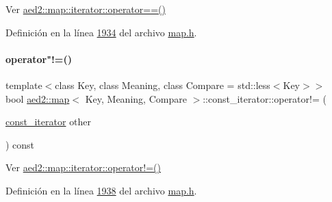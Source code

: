 Ver \hyperlink{classaed2_1_1map_1_1iterator_a34f6622845af93ca42f1be8516eeafa2_a34f6622845af93ca42f1be8516eeafa2}{aed2\+::map\+::iterator\+::operator==()} 



Definición en la línea \hyperlink{map_8h_source_l01934}{1934} del archivo \hyperlink{map_8h_source}{map.\+h}.

\mbox{\label{classaed2_1_1map_1_1const__iterator_aeb4721e5da865908c541f2a77a2ffab2_aeb4721e5da865908c541f2a77a2ffab2}} 
\paragraph{\texorpdfstring{operator"!=()}{operator!=()}}
{\footnotesize\ttfamily template$<$class Key, class Meaning, class Compare = std\+::less$<$\+Key$>$$>$ \\
bool \hyperlink{classaed2_1_1map}{aed2\+::map}$<$ Key, Meaning, Compare $>$\+::const\+\_\+iterator\+::operator!= (\begin{DoxyParamCaption}\item[{\hyperlink{classaed2_1_1map_1_1const__iterator}{const\+\_\+iterator}}]{other }\end{DoxyParamCaption}) const\hspace{0.3cm}{\ttfamily [inline]}}



Ver \hyperlink{classaed2_1_1map_1_1iterator_a748cdf8c35707d1c2e9ef8ef9d862d37_a748cdf8c35707d1c2e9ef8ef9d862d37}{aed2\+::map\+::iterator\+::operator!=()} 



Definición en la línea \hyperlink{map_8h_source_l01938}{1938} del archivo \hyperlink{map_8h_source}{map.\+h}.

\mbox{\label{classaed2_1_1map_1_1const__iterator_ab408eb7252948dd8b8df540303ab5906_ab408eb7252948dd8b8df540303ab5906}} 
